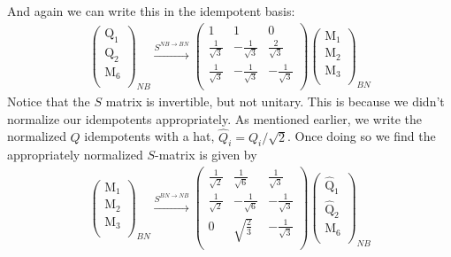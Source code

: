 \documentclass[12pt,a4paper]{article}
\newcounter{arrow}
\begin{document}
And again we can write this in the idempotent basis:
\begin{align}
\left( \begin{matrix}
\text{Q}_1\\
\text{Q}_2\\
\text{M}_6\\
\end{matrix} \right)_{NB}
\xrightarrow{S^{NB \rightarrow BN}}
\left( \begin{matrix}
1& 1& 0 \\
\frac{1}{\sqrt{3}} & - \frac{1}{\sqrt{3}} & \frac{2}{\sqrt{3}} \\
\frac{1}{\sqrt{3}} & - \frac{1}{\sqrt{3}} & - \frac{1}{\sqrt{3}} \\
\end{matrix} \right)
\left( \begin{matrix}
\text{M}_1\\
\text{M}_2\\
\text{M}_3\\
\end{matrix} \right)_{BN}
\end{align}
Notice that the $S$ matrix is invertible, but not unitary. 
This is because we didn't normalize our idempotents appropriately. 
As mentioned earlier, we write the normalized $Q$ idempotents with a hat, $\widehat{Q}_i = Q_i /\sqrt{2}$.
Once doing so we find the appropriately normalized $S$-matrix is given by
\begin{align}\left( \begin{matrix}
\text{M}_1\\
\text{M}_2\\
\text{M}_3\\
\end{matrix} \right)_{BN}
\xrightarrow{S^{BN \rightarrow NB}}
\left( \begin{matrix}
\frac{1}{\sqrt{2}} & \frac{1}{\sqrt{6}} &  \frac{1}{\sqrt{3}} \\
\frac{1}{\sqrt{2}} & - \frac{1}{\sqrt{6}} & -\frac{1}{\sqrt{3}} \\
0& \sqrt{\frac{2}{3}} & -\frac{1}{\sqrt{3}} \\
\end{matrix} \right)
\left( \begin{matrix}
\widehat{\text{Q}}_1\\
\widehat{\text{Q}}_2\\
\text{M}_6\\
\end{matrix} \right)_{NB}
\end{align}
\end{document}

